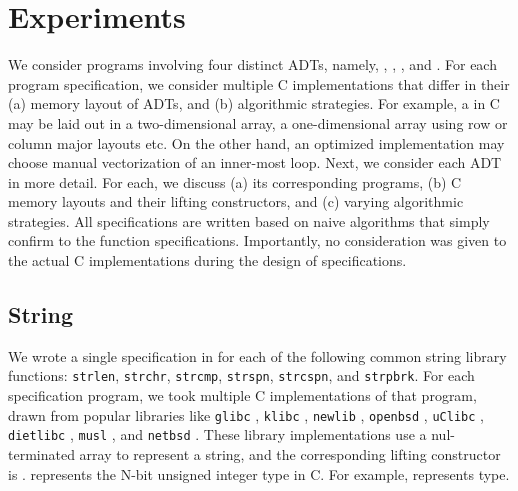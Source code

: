 \section{Experiments}
\label{sec:experiments}
\vspace{-5px}
We consider programs involving four distinct ADTs, namely,
 ,  ,  ,
and  .
For each \SpecL{} program specification, we consider multiple
C implementations that differ in their (a) memory layout of ADTs, and
(b) algorithmic strategies. For example, a  in C may be laid out
in a two-dimensional array, a one-dimensional array using row or column major
layouts etc. On the other hand, an optimized implementation may choose manual vectorization
of an inner-most loop. Next, we consider each ADT in more detail. For each,
we discuss (a) its corresponding programs, (b) C memory layouts and their lifting
constructors, and (c) varying algorithmic strategies.
All \SpecL{} specifications are written based on naive algorithms that simply confirm to the function specifications.
Importantly, no consideration was given to the actual C implementations during the design of specifications.

\vspace{-5px}
\subsection{String}
\label{sec:expstring}
\vspace{-5px}
We wrote a single specification in \SpecL{} for each of the following
common string library functions: {\tt strlen}, {\tt strchr}, {\tt strcmp}, {\tt strspn},
{\tt strcspn}, and {\tt strpbrk}.  For each specification
program, we took multiple C implementations of that program, drawn from popular
libraries like {\tt glibc} \cite{glibc}, {\tt klibc} \cite{klibc}, {\tt newlib} \cite{newlib},
{\tt openbsd} \cite{openbsdlibc}, {\tt uClibc} \cite{uclibc},
{\tt dietlibc} \cite{dietlibc}, {\tt musl} \cite{musl}, and {\tt netbsd} \cite{netbsd}.
These library implementations use a nul-terminated array to represent
a string, and the corresponding lifting constructor is .
 represents the N-bit unsigned integer type in C.
For example,  represents  type.


